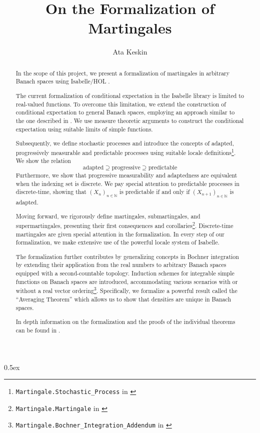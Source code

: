 ﻿\documentclass[11pt,a4paper]{article}
\begin{document}
\title{On the Formalization of Martingales}
\author{Ata Keskin}
\maketitle
\begin{abstract}
In the scope of this project, we present a formalization of martingales in arbitrary Banach spaces using Isabelle/HOL \cite{Keskin_A_Formalization_of_2023}.

The current formalization of conditional expectation in the Isabelle library is limited to real-valued functions. To overcome this limitation, we extend the construction of conditional expectation to general Banach spaces, employing an approach similar to the one described in \cite{Hytoenen_2016}. We use measure theoretic arguments to construct the conditional expectation using suitable limits of simple functions.

Subsequently, we define stochastic processes and introduce the concepts of adapted, progressively measurable and predictable processes using suitable locale definitions\footnote{\texttt{Martingale.Stochastic\_Process} in \cite{Keskin_A_Formalization_of_2023}}. We show the relation
\[
	\text{adapted} \supseteq \text{progressive} \supseteq \text{predictable}
\]
Furthermore, we show that progressive measurability and adaptedness are equivalent when the indexing set is discrete.
We pay special attention to predictable processes in discrete-time, showing that $(X_n)_{n \in \mathbb{N}}$ is predictable if and only if $(X_{n + 1})_{n \in \mathbb{N}}$ is adapted.

Moving forward, we rigorously define martingales, submartingales, and supermartingales, presenting their first consequences and corollaries\footnote{\texttt{Martingale.Martingale} in \cite{Keskin_A_Formalization_of_2023}}. Discrete-time martingales are given special attention in the formalization. In every step of our formalization, we make extensive use of the powerful locale system of Isabelle.

The formalization further contributes by generalizing concepts in Bochner integration by extending their application from the real numbers to arbitrary Banach spaces equipped with a second-countable topology. Induction schemes for integrable simple functions on Banach spaces are introduced, accommodating various scenarios with or without a real vector ordering\footnote{\texttt{Martingale.Bochner\_Integration\_Addendum} in \cite{Keskin_A_Formalization_of_2023}}. Specifically, we formalize a powerful result called the ``Averaging Theorem''\cite{Lang_1993} which allows us to show that densities are unique in Banach spaces.

In depth information on the formalization and the proofs of the individual theorems can be found in \cite{keskin2023formalization}.
\end{abstract}
\tableofcontents
\pagebreak

\parindent 0pt\parskip 0.5ex





\end{document}
